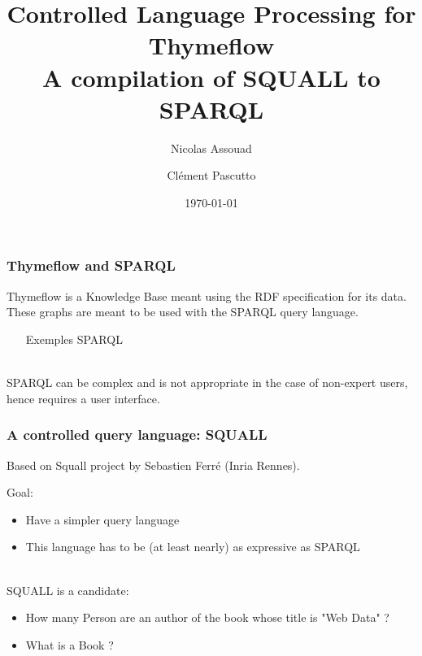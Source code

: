 \documentclass{beamer}
\author{Nicolas Assouad\and Cl\'ement Pascutto}
\title[Controlled Language for Thymeflow]{Controlled Language Processing for Thymeflow\\A compilation of SQUALL to SPARQL}
\date{\today}
\begin{document}

  \begin{frame}
	   \titlepage
  \end{frame}

	\begin{frame}
		\frametitle{Thymeflow and SPARQL}
    Thymeflow is a Knowledge Base meant using the RDF specification for its data.
    ~\\
    These graphs are meant to be used with the SPARQL query language.
    \begin{itemize}
      \item [Exemples SPARQL]
    \end{itemize}
    ~\\
    SPARQL can be complex and is not appropriate in the case of non-expert users, hence requires a user interface.
	\end{frame}
  \begin{frame}
    \frametitle{A controlled query language: SQUALL}
    Based on Squall project by Sebastien Ferré (Inria Rennes).

    Goal:
    \begin{itemize}
      \item Have a simpler query language
      \item This language has to be (at least nearly) as expressive as SPARQL
    \end{itemize}
    ~\\
    SQUALL is a candidate:
    \begin{itemize}
      \item How many Person are an author of the book whose title is "Web Data" ?
      \item What is a Book ?
    \end{itemize}
  \end{frame}
\end{document}
